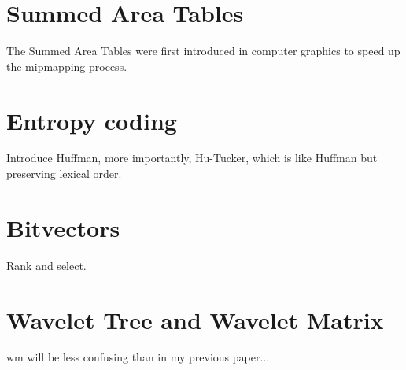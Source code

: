 \documentclass[a4paper,10pt,twoside]{book}
\begin{document}
	\section{Summed Area Tables}
	The Summed Area Tables were first introduced in computer graphics \cite{crow1984summed} to speed up the mipmapping process.
	
	\section{Entropy coding}
	Introduce Huffman, more importantly, Hu-Tucker, which is like Huffman but preserving lexical order.
	
	\section{Bitvectors}
	Rank and select.
	
	\section{Wavelet Tree and Wavelet Matrix}
	\label{sec:wt}
	\gls{wm} will be less confusing than in my previous paper...
	
\end{document}
